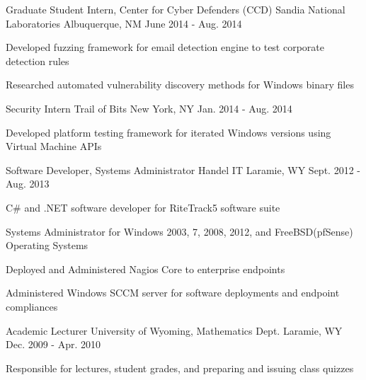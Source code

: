 \begin{cventries}

\cventry
{Graduate Student Intern, Center for Cyber Defenders (CCD)} %
{Sandia National Laboratories} %
{Albuquerque, NM} %
{June 2014 - Aug. 2014} %
{ %
\begin{cvitems}
    \item {Developed fuzzing framework for email detection engine to test corporate detection rules}
    \item {Researched automated vulnerability discovery methods for Windows binary files}
\end{cvitems}
}


\cventry
{Security Intern} %
{Trail of Bits} %
{New York, NY} %
{Jan. 2014 - Aug. 2014} %
{ %
\begin{cvitems}
    \item {Developed platform testing framework for iterated Windows versions using Virtual Machine APIs}
\end{cvitems}
}


\begin{displaySection}

    \cventry
    {Software Developer, Systems Administrator} %
    {Handel IT} %
    {Laramie, WY} %
    {Sept. 2012 - Aug. 2013} %
    { %
    \begin{cvitems}
    \item {C\# and .NET software developer for RiteTrack5 software suite}
    \item {Systems Administrator for Windows 2003, 7, 2008, 2012, and FreeBSD(pfSense) Operating Systems}
    \item {Deployed and Administered Nagios Core to enterprise endpoints}
    \item {Administered Windows SCCM server for software deployments and endpoint compliances}
    \end{cvitems} 
    }

    \cventry
    {Academic Lecturer} %
    {University of Wyoming, Mathematics Dept.} %
    {Laramie, WY} %
    {Dec. 2009 - Apr. 2010} %
    { %
    \begin{cvitems}
    \item {Responsible for lectures, student grades, and preparing and issuing class quizzes}
    \end{cvitems}
    }


\end{displaySection}
\end{cventries}
